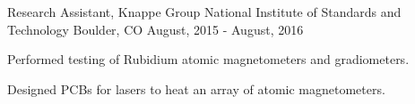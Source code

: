\begin{cventries}
  \cventry
    {Research Assistant, Knappe Group} %
    {National Institute of Standards and Technology} %
    {Boulder, CO} %
    {August, 2015 - August, 2016} %
    {
      \begin{cvitems} %
        \item {Performed testing of Rubidium atomic magnetometers and
          gradiometers.}
        \item {Designed PCBs for lasers to heat an array of atomic
          magnetometers.}
      \end{cvitems}
    }

\end{cventries}
